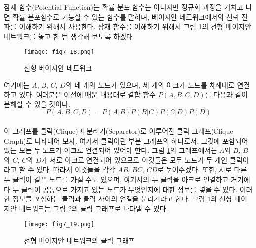 \documentclass[a4paper]{oblivoir}
\begin{document}
잠재 함수(Potential Function)는 확률 분포 함수는 아니지만 정규화 과정을 거치고 나면 확률 분포함수로 기능할 수 있는 함수를 말하며, 베이지안 네트워크에서의 신뢰 전파를 이해하기 위해서 사용한다. 잠재 함수를 이해하기 위해서 그림 \ref{fig:7-24}의 선형 베이지안 네트워크를 놓고 한 번 생각해 보도록 하겠다. \\

\begin{figure}[ht] \centering 
\texttt{[image: fig7\_18.png]} 
\caption{선형 베이지안 네트워크}
\label{fig:7-24}
\end{figure} 

\noindent 여기에는 $A$, $B$, $C$, $D$의 네 개의 노드가 있으며, 세 개의 아크가 노드를 차례대로 연결하고 있다. 여러분은 이전에 배운 내용대로 결합 함수 $P(A,B,C,D)$를 다음과 같이 분해할 수 있을 것이다.
\begin{equation}
P(A,B,C,D) = P(A|B) P(B|C) P(C|D) P(D)
\label{eq:7-32}
\end{equation} \\

이 그래프를 클릭(Clique)과 분리기(Separator)로 이루어진 클릭 그래프(Clique Graph)로 나타내어 보자. 여기서 클릭이란 부분 그래프의 하나로서, 그것에 포함되어 있는 모든 두 노드가 아크로 연결되어 있어야 한다. 그림 \ref{fig:7-24}의 그래프에서는 $A$와 $B$, $B$와 $C$, $C$와 $D$가 서로 아크로 연결되어 있으므로 이것들은 모두 노드가 두 개인 클릭이라고 할 수 있다. 따라서 이것들을 각각 $AB$, $BC$, $CD$로 묶어주겠다. 또한, 서로 다른 두 클릭이 같은 노드를 가질 수도 있으며, 여기서의 두 클릭을 아크로 연결하고 거기에다 두 클릭이 공통으로 가지고 있는 노드가 무엇인지에 대한 정보를 넣을 수 있다. 이러한 정보를 포함하는 클릭과 클릭 사이의 연결을 분리기라고 한다. 그림 \ref{fig:7-24}의 선형 베이지안 네트워크는 그림 \ref{fig:7-25}의 클릭 그래프로 나타낼 수 있다. \\   

\begin{figure}[ht] \centering 
\texttt{[image: fig7\_19.png]} 
\caption{선형 베이지안 네트워크의 클릭 그래프}
\label{fig:7-25}
\end{figure} 
\end{document}
